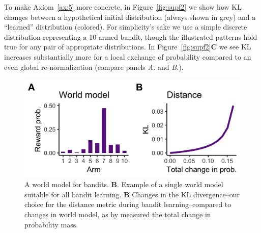 To make Axiom~\ref{ax:5} more concrete, in Figure~\ref{fig:supf2} we show how KL changes between a hypothetical initial distribution (always shown in grey) and a ``learned'' distribution (colored). For simplicity's sake we use a simple discrete distribution representing a 10-armed bandit, though the illustrated patterns hold true for any pair of appropriate distributions. In Figure~\ref{fig:supf2}\textbf{C} we see KL increases substantially more for a local exchange of probability compared to an even global re-normalization (compare panels \textit{A.} and \textit{B.}). 

\begin{figure}
	[tbhp] \centering 
	\includegraphics[width=.95\linewidth]{figures/subfig1.png} 
	\caption{\label{fig:supf1} A world model for bandits.
	\textbf{B}. Example of a single world model suitable for all bandit learning.
	\textbf{B} Changes in the KL divergence--our choice for the distance metric during bandit learning--compared to changes in world model, as by measured the total change in probability mass.}
\end{figure}

